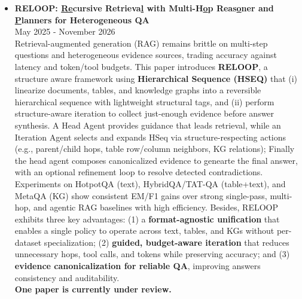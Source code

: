 \documentclass[10pt,article]{article}
\begin{document}
\begin{itemize}
    \item \textbf{RELOOP: \underline{Re}cursive Retrieva\underline{l} with Multi-H\underline{o}p Reas\underline{o}ner and \underline{P}lanners for Heterogeneous QA} \\ \hfill May 2025 - November 2026 \\
    Retrieval-augmented generation (RAG) remains brittle on multi-step questions and heterogeneous evidence sources, trading accuracy against latency and token/tool budgets. This paper introduces \textbf{RELOOP}, a structure aware framework using \textbf{Hierarchical Sequence (HSEQ)} that (i) linearize documents, tables, and knowledge graphs into a reversible hierarchical sequence with lightweight structural tags, and (ii) perform structure-aware iteration to collect just-enough evidence before answer synthesis. A Head Agent provides guidance that leads retrieval, while an Iteration Agent selects and expands HSeq via structure-respecting actions (e.g., parent/child hops, table row/column neighbors, KG relations); Finally the head agent composes canonicalized evidence to genearte the final answer, with an optional refinement loop to resolve detected contradictions. Experiments on HotpotQA (text), HybridQA/TAT-QA (table+text), and MetaQA (KG) show consistent EM/F1 gains over strong single-pass, multi-hop, and agentic RAG baselines with high efficiency. Besides, RELOOP exhibits three key advantages: (1) a \textbf{format-agnostic unification} that enables a single policy to operate across text, tables, and KGs without per-dataset specialization; (2) \textbf{guided, budget-aware iteration} that reduces unnecessary hops, tool calls, and tokens while preserving accuracy; and (3) \textbf{evidence canonicalization for reliable QA}, improving answers consistency and auditability. \\
    \textbf{One paper is currently under review.}


\end{itemize}
\end{document}

